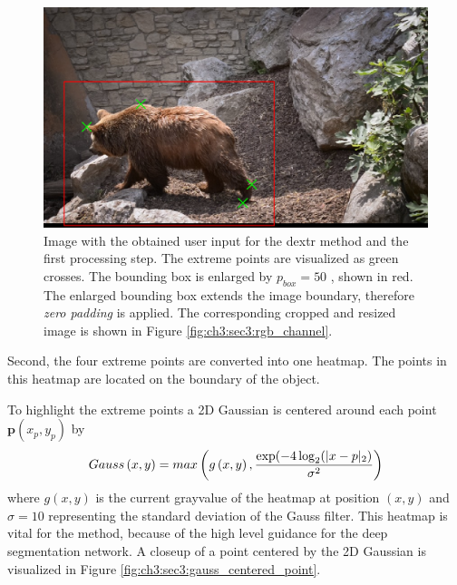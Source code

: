 \begin{figure}
	\includegraphics[width=\linewidth]{figures/chap33_bear_bbox.png}
	\caption[DEXTR User Interaction]{		
		Image with the obtained user input for the \gls{dextr} method and the first processing step.
		The extreme points are visualized as green crosses.
		The bounding box is enlarged by $p_{{box}} = 50$ , shown in red.
		The enlarged bounding box extends the image boundary, therefore \textit{zero padding} is applied.
		The corresponding cropped and resized image is shown in Figure \ref{fig:ch3:sec3:rgb_channel}.
	}
	\label{fig:ch3:sec3:user_interaction}
\end{figure}


Second, the four extreme points are converted into one heatmap.
The points in this heatmap are located on the boundary of the object.

To highlight the extreme points a 2D Gaussian is centered around each point $ \textbf{p} (x_p, y_p) $ by
\begin{equation} \label{equ:gauss}
	\centering
	Gauss \left( x,y \right)  = max \left( g\left( x,y\right) , \frac{\exp(- 4 \log_{2}(| x - p |_2)}{\sigma^{2}}\right) 
\end{equation}
where $ g (x,y) $ is the current grayvalue of the heatmap at position $ (x, y) $ and $ \sigma = 10 $ representing the standard deviation of the Gauss filter.
This heatmap is vital for the method, because of the high level guidance for the deep segmentation network.
A closeup of a point centered by the 2D Gaussian is visualized in Figure \ref{fig:ch3:sec3:gauss_centered_point}.

